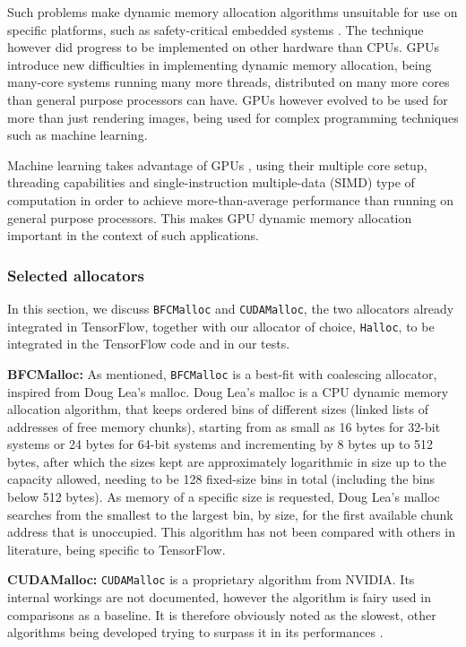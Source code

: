 \documentclass[12pt,twoside]{article}
\begin{document}
Such problems make dynamic memory allocation algorithms unsuitable for use on specific platforms, such as safety-critical embedded systems \cite{Puaut_2002}. The technique however did progress to be implemented on other hardware than CPUs. GPUs introduce new difficulties in implementing dynamic memory allocation, being many-core systems running many more threads, distributed on many more cores than general purpose processors can have. GPUs however evolved to be used for more than just rendering images, being used for complex programming techniques such as machine learning. 

Machine learning takes advantage of GPUs \cite{deep-learning-gpu}, using their multiple core setup, threading capabilities and single-instruction multiple-data (SIMD) type of computation in order to achieve more-than-average performance than running on general purpose processors. This makes GPU dynamic memory allocation important in the context of such applications.


\subsubsection*{Selected allocators}

In this section, we discuss \texttt{BFCMalloc} and \texttt{CUDAMalloc}, the two allocators already integrated in TensorFlow, together with our allocator of choice, \texttt{Halloc}, to be integrated in the TensorFlow code and in our tests.

\textbf{BFCMalloc:} As mentioned, \texttt{BFCMalloc} is a best-fit with coalescing allocator, inspired from Doug Lea's malloc. Doug Lea's malloc \cite{dlmalloc} is a CPU dynamic memory allocation algorithm, that keeps ordered bins of different sizes (linked lists of addresses of free memory chunks), starting from as small as 16 bytes for 32-bit systems or 24 bytes for 64-bit systems and incrementing by 8 bytes up to 512 bytes, after which the sizes kept are approximately logarithmic in size up to the capacity allowed, needing to be 128 fixed-size bins in total (including the bins below 512 bytes). As memory of a specific size is requested, Doug Lea's malloc searches from the smallest to the largest bin, by size, for the first available chunk address that is unoccupied. This algorithm has not been compared with others in literature, being specific to TensorFlow.

\textbf{CUDAMalloc:} \texttt{CUDAMalloc} is a proprietary algorithm from NVIDIA. Its internal workings are not documented, however the algorithm is fairy used in comparisons as a baseline. It is therefore obviously noted as the slowest, other algorithms being developed trying to surpass it in its performances \cite{halloc-paper} \cite{Vinkler2015}.
\end{document}
